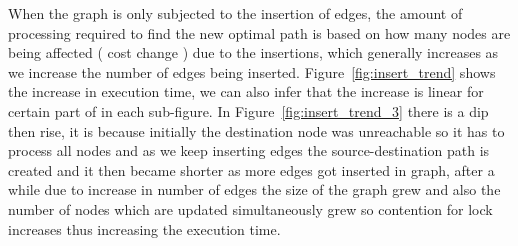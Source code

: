 \documentclass[a4paper]{article}
\begin{document}
When the graph is only subjected to the insertion of edges, the amount of processing required to find the new optimal path is based on how many nodes are being affected ( cost change ) due to the insertions, which generally increases as we increase the number of edges being inserted. Figure~\ref{fig:insert_trend} shows the increase in execution time, we can also infer that the increase is linear for certain part of in each sub-figure. In Figure~\ref{fig:insert_trend_3} there is a dip then rise, it is because initially the destination node was unreachable so it has to process all nodes and as we keep inserting edges the source-destination path is created and it then became shorter as more edges got inserted in graph, after a while due to increase in number of edges the size of the graph grew and also the number of nodes which are updated simultaneously grew so contention for lock increases thus increasing the execution time.
\end{document}
